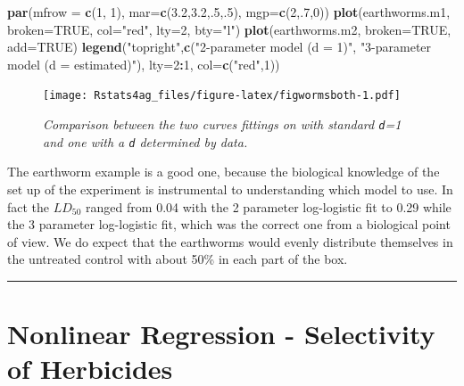 \documentclass[letterpaper,]{book}
\newenvironment{Shaded}{\begin{snugshade}}{\end{snugshade}}
\newcommand{\DataTypeTok}[1]{\textcolor[rgb]{0.13,0.29,0.53}{#1}}
\newcommand{\DecValTok}[1]{\textcolor[rgb]{0.00,0.00,0.81}{#1}}
\newcommand{\FloatTok}[1]{\textcolor[rgb]{0.00,0.00,0.81}{#1}}
\newcommand{\KeywordTok}[1]{\textcolor[rgb]{0.13,0.29,0.53}{\textbf{#1}}}
\newcommand{\NormalTok}[1]{#1}
\newcommand{\OperatorTok}[1]{\textcolor[rgb]{0.81,0.36,0.00}{\textbf{#1}}}
\newcommand{\OtherTok}[1]{\textcolor[rgb]{0.56,0.35,0.01}{#1}}
\newcommand{\StringTok}[1]{\textcolor[rgb]{0.31,0.60,0.02}{#1}}
\begin{document}
\begin{Shaded}
\begin{Highlighting}[]
\KeywordTok{par}\NormalTok{(}\DataTypeTok{mfrow =} \KeywordTok{c}\NormalTok{(}\DecValTok{1}\NormalTok{, }\DecValTok{1}\NormalTok{), }\DataTypeTok{mar=}\KeywordTok{c}\NormalTok{(}\FloatTok{3.2}\NormalTok{,}\FloatTok{3.2}\NormalTok{,.}\DecValTok{5}\NormalTok{,.}\DecValTok{5}\NormalTok{), }\DataTypeTok{mgp=}\KeywordTok{c}\NormalTok{(}\DecValTok{2}\NormalTok{,.}\DecValTok{7}\NormalTok{,}\DecValTok{0}\NormalTok{))}
\KeywordTok{plot}\NormalTok{(earthworms.m1, }\DataTypeTok{broken=}\OtherTok{TRUE}\NormalTok{,  }\DataTypeTok{col=}\StringTok{"red"}\NormalTok{, }\DataTypeTok{lty=}\DecValTok{2}\NormalTok{, }\DataTypeTok{bty=}\StringTok{"l"}\NormalTok{)}
\KeywordTok{plot}\NormalTok{(earthworms.m2, }\DataTypeTok{broken=}\OtherTok{TRUE}\NormalTok{, }\DataTypeTok{add=}\OtherTok{TRUE}\NormalTok{)}
\KeywordTok{legend}\NormalTok{(}\StringTok{"topright"}\NormalTok{,}\KeywordTok{c}\NormalTok{(}\StringTok{"2-parameter model (d = 1)"}\NormalTok{, }\StringTok{"3-parameter model (d = estimated)"}\NormalTok{),}
       \DataTypeTok{lty=}\DecValTok{2}\OperatorTok{:}\DecValTok{1}\NormalTok{, }\DataTypeTok{col=}\KeywordTok{c}\NormalTok{(}\StringTok{"red"}\NormalTok{,}\DecValTok{1}\NormalTok{))}
\end{Highlighting}
\end{Shaded}

\begin{figure}
\centering
\texttt{[image: Rstats4ag\_files/figure-latex/figwormsboth-1.pdf]}
\caption{\label{fig:figwormsboth}\emph{Comparison between the two curves fittings on with standard \texttt{d}=1 and one with a \texttt{d} determined by data.}}
\end{figure}

The earthworm example is a good one, because the biological knowledge of the set up of the experiment is instrumental to understanding which model to use. In fact the \(LD_{50}\) ranged from 0.04 with the 2 parameter log-logistic fit to 0.29 while the 3 parameter log-logistic fit, which was the correct one from a biological point of view. We do expect that the earthworms would evenly distribute themselves in the untreated control with about 50\% in each part of the box.

\begin{center}\rule{0.5\linewidth}{0.5pt}\end{center}

\hypertarget{nonlinear-regression---selectivity-of-herbicides}{%
\chapter{Nonlinear Regression - Selectivity of Herbicides}\label{nonlinear-regression---selectivity-of-herbicides}}
\end{document}
